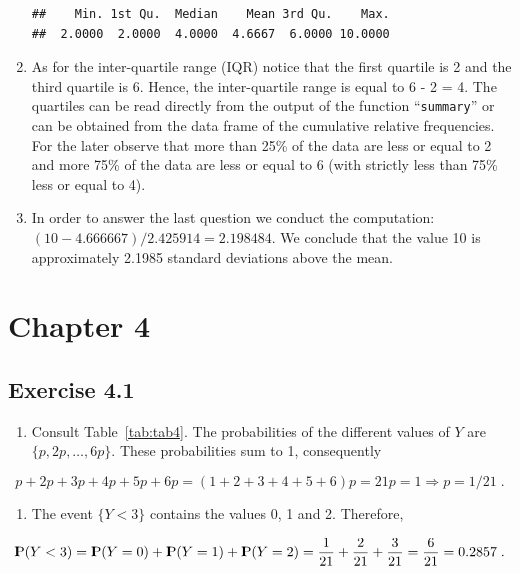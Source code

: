 \documentclass[]{krantz}
\providecommand{\tightlist}{%
  \setlength{\itemsep}{0pt}\setlength{\parskip}{0pt}}
\newcommand{\Prob}{{\rm I\kern-.3em P}}
\theoremstyle{definition}
\theoremstyle{definition}
\theoremstyle{definition}
\theoremstyle{remark}
\begin{document}
\begin{enumerate}
\begin{verbatim}
##    Min. 1st Qu.  Median    Mean 3rd Qu.    Max. 
##  2.0000  2.0000  4.0000  4.6667  6.0000 10.0000
\end{verbatim}
\item
  As for the inter-quartile range (IQR) notice that the first quartile
  is 2 and the third quartile is 6. Hence, the inter-quartile range is
  equal to 6 - 2 = 4. The quartiles can be read directly from the output
  of the function ``\texttt{summary}'' or can be obtained from the data
  frame of the cumulative relative frequencies. For the later observe
  that more than 25\% of the data are less or equal to 2 and more 75\%
  of the data are less or equal to 6 (with strictly less than 75\% less
  or equal to 4).
\item
  In order to answer the last question we conduct the computation:
  \((10 - 4.666667)/2.425914 = 2.198484\). We conclude that the value 10
  is approximately 2.1985 standard deviations above the mean.
\end{enumerate}

\section*{Chapter 4}\label{chapter-4}


\subsection*{Exercise 4.1}\label{exercise-4.1}


\begin{enumerate}
\def\labelenumi{\arabic{enumi}.}
\tightlist
\item
  Consult Table~\ref{tab:tab4}. The probabilities of the different
  values of \(Y\) are \(\{p, 2p, \ldots, 6p\}\). These probabilities sum
  to 1, consequently
\end{enumerate}

\[p + 2p + 3 p + 4 p + 5 p + 6p = (1+2+3+4+5+6)p = 21 p = 1 \Longrightarrow p = 1/21\;.\]

\begin{enumerate}
\def\labelenumi{\arabic{enumi}.}
\setcounter{enumi}{1}
\tightlist
\item
  The event \(\{Y < 3\}\) contains the values 0, 1 and 2. Therefore,
\end{enumerate}

\[\Prob(Y < 3) = \Prob(Y=0) + \Prob(Y=1) + \Prob(Y=2) = \frac{1}{21} + \frac{2}{21} + \frac{3}{21} = \frac{6}{21}= 0.2857\;.\]
\end{document}
